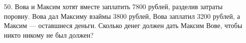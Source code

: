 50. Вова и Максим хотят вместе заплатить 7800 рублей, разделив затраты поровну. Вова дал Максиму взаймы 3800 рублей, Вова заплатил 3200 рублей, а Максим --- оставшиеся деньги. Сколько денег должен дать Максим Вове, чтобы никто никому не был должен?\\
